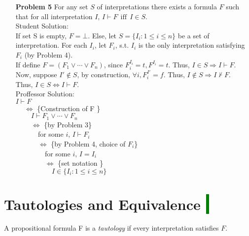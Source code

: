 \documentclass[12pt]{article}
\begin{document}
\begin{enumerate}
\item[\textbf{Problem 5}] For any set $S$ of interpretations there exists a formula $F$ such that for all interpretation $I$, $I \vdash F ~~\text{iff}~~ I \in S$. \\
Student Solution: \\
If set S is empty, $F = \bot$. Else, let $S = \{ I_i :1 \leq i \leq n \}$ be a set of interpretation. For each $I_i$, let $F_i$, s.t. $I_i$ is the only interpretation satisfying $F_i$ (by Problem 4).  \\
If define $F = (F_1 \vee \cdots \vee F_n)$, since $F_i^{I_i} = t, F^{I_i} = t$. Thus, $I \in S \Rightarrow I \vdash F$. \\
Now, suppose $I' \notin S$, by construction, $\forall i, F_i^{I'} = f$. Thus,  $I \notin S \Rightarrow I \not\vdash F$. \\
Thus, $I \in S \iff I \vdash F$.\\

Proffessor Solution: \\
$I \vdash F$ \\
$~\quad \iff$  \{Construction of F \}\\
    $~\qquad I \vdash F_1 \vee \cdots \vee F_n $  \\
$~\qquad \iff$   \{by Problem 3\}  \\ 
    $~\qquad \quad$for some $i$, $I \vdash F_i$  \\
 $~\qquad \quad \iff$   \{by Problem 4, choice of $F_i$\}  \\ 
    $~\qquad \qquad$for some $i$, $I = I_i$  \\
 $~\qquad \qquad \iff$   \{set notation \}  \\ 
 $~\qquad \qquad \quad I \in \{  I_i :1 \leq i \leq n\}$   \\ 

\end{enumerate}

\section*{Tautologies and Equivalence \colorbox{green}{$~$ }}
A propositional formula F is a \textit{tautology} if every interpretation satisfies $F$.
\end{document}
